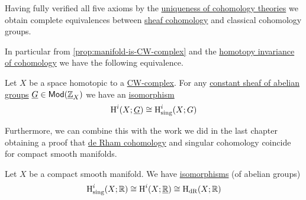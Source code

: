 \documentclass[../../main]{subfiles}
\begin{document}

Having fully verified all five axioms by the \hyperref[thm:uniqueness-cohomology-theories]{uniqueness of cohomology theories} we obtain complete equivalences between \hyperref[def:sheaf-cohomology]{sheaf cohomology} and classical cohomology groups.

In particular from \autoref{prop:manifold-is-CW-complex} and the \hyperref[thm:homotopy-invariance-cohomology]{homotopy invariance of cohomology} we have the following equivalence.
\begin{corollary}
  Let \(X\) be a space homotopic to a \hyperref[def:CW-complex]{CW-complex}.
  For any \hyperref[def:constant-sheaf]{constant sheaf of abelian groups} \(\underline{G} \in \mathsf{Mod}(\underline{\mathbb{Z}}_{X})\) we have an \hyperref[def:categorical-isomorphism]{isomorphism}
    \begin{equation*}
        \operatorname{H}^{i}(X; \underline{G}) \cong \operatorname{H}_{\operatorname{sing}}^{i}(X; G)
    \end{equation*}
\end{corollary}

Furthermore, we can combine this with the work we did in the last chapter obtaining a proof that \hyperref[def:de-rham-cohomology]{de Rham cohomology} and singular cohomology coincide for compact smooth manifolds.
\begin{corollary}
  Let \(X\) be a compact smooth manifold.
  We have \hyperref[def:categorical-isomorphism]{isomorphisms} (of abelian groups)
  \begin{equation*}
    \operatorname{H}_{\operatorname{sing}}^{i}(X; \mathbb{R}) \cong \operatorname{H}^{i}(X; \underline{\mathbb{R}}) \cong \operatorname{H}_{\operatorname{dR}}(X; \mathbb{R})
  \end{equation*}
\end{corollary}
\end{document}
